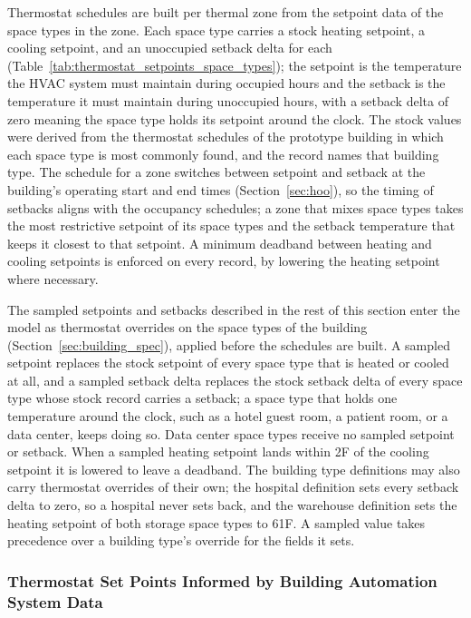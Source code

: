 Thermostat schedules are built per thermal zone from the setpoint data of the space types in the zone. Each space type carries a stock heating setpoint, a cooling setpoint, and an unoccupied setback delta for each (Table~\ref{tab:thermostat_setpoints_space_types}); the setpoint is the temperature the HVAC system must maintain during occupied hours and the setback is the temperature it must maintain during unoccupied hours, with a setback delta of zero meaning the space type holds its setpoint around the clock. The stock values were derived from the thermostat schedules of the prototype building in which each space type is most commonly found, and the record names that building type. The schedule for a zone switches between setpoint and setback at the building's operating start and end times (Section~\ref{sec:hoo}), so the timing of setbacks aligns with the occupancy schedules; a zone that mixes space types takes the most restrictive setpoint of its space types and the setback temperature that keeps it closest to that setpoint. A minimum deadband between heating and cooling setpoints is enforced on every record, by lowering the heating setpoint where necessary.

The sampled setpoints and setbacks described in the rest of this section enter the model as thermostat overrides on the space types of the building (Section~\ref{sec:building_spec}), applied before the schedules are built. A sampled setpoint replaces the stock setpoint of every space type that is heated or cooled at all, and a sampled setback delta replaces the stock setback delta of every space type whose stock record carries a setback; a space type that holds one temperature around the clock, such as a hotel guest room, a patient room, or a data center, keeps doing so. Data center space types receive no sampled setpoint or setback. When a sampled heating setpoint lands within 2\textdegree F of the cooling setpoint it is lowered to leave a deadband. The building type definitions may also carry thermostat overrides of their own; the hospital definition sets every setback delta to zero, so a hospital never sets back, and the warehouse definition sets the heating setpoint of both storage space types to 61\textdegree F. A sampled value takes precedence over a building type's override for the fields it sets.

\subsubsection{Thermostat Set Points Informed by Building Automation System Data}
\label{section:therm_setpoints_bas}

